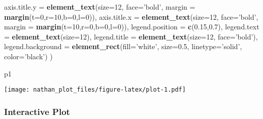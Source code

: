 \documentclass[]{article}
\newenvironment{Shaded}{\begin{snugshade}}{\end{snugshade}}
\newcommand{\KeywordTok}[1]{\textcolor[rgb]{0.13,0.29,0.53}{\textbf{#1}}}
\newcommand{\DataTypeTok}[1]{\textcolor[rgb]{0.13,0.29,0.53}{#1}}
\newcommand{\DecValTok}[1]{\textcolor[rgb]{0.00,0.00,0.81}{#1}}
\newcommand{\FloatTok}[1]{\textcolor[rgb]{0.00,0.00,0.81}{#1}}
\newcommand{\StringTok}[1]{\textcolor[rgb]{0.31,0.60,0.02}{#1}}
\newcommand{\NormalTok}[1]{#1}
\begin{document}
\begin{Shaded}
\begin{Highlighting}[]
    \DataTypeTok{axis.title.y =} \KeywordTok{element_text}\NormalTok{(}\DataTypeTok{size=}\DecValTok{12}\NormalTok{, }\DataTypeTok{face=}\StringTok{'bold'}\NormalTok{, }\DataTypeTok{margin =} \KeywordTok{margin}\NormalTok{(}\DataTypeTok{t=}\DecValTok{0}\NormalTok{,}\DataTypeTok{r=}\DecValTok{10}\NormalTok{,}\DataTypeTok{b=}\DecValTok{0}\NormalTok{,}\DataTypeTok{l=}\DecValTok{0}\NormalTok{)),}
    \DataTypeTok{axis.title.x =} \KeywordTok{element_text}\NormalTok{(}\DataTypeTok{size=}\DecValTok{12}\NormalTok{, }\DataTypeTok{face=}\StringTok{'bold'}\NormalTok{, }\DataTypeTok{margin =} \KeywordTok{margin}\NormalTok{(}\DataTypeTok{t=}\DecValTok{10}\NormalTok{,}\DataTypeTok{r=}\DecValTok{0}\NormalTok{,}\DataTypeTok{b=}\DecValTok{0}\NormalTok{,}\DataTypeTok{l=}\DecValTok{0}\NormalTok{)),}
    \DataTypeTok{legend.position =} \KeywordTok{c}\NormalTok{(}\FloatTok{0.15}\NormalTok{,}\FloatTok{0.7}\NormalTok{),}
    \DataTypeTok{legend.text =} \KeywordTok{element_text}\NormalTok{(}\DataTypeTok{size=}\DecValTok{12}\NormalTok{),}
    \DataTypeTok{legend.title =} \KeywordTok{element_text}\NormalTok{(}\DataTypeTok{size=}\DecValTok{12}\NormalTok{, }\DataTypeTok{face=}\StringTok{'bold'}\NormalTok{),}
    \DataTypeTok{legend.background =} \KeywordTok{element_rect}\NormalTok{(}\DataTypeTok{fill=}\StringTok{'white'}\NormalTok{, }\DataTypeTok{size=}\FloatTok{0.5}\NormalTok{, }\DataTypeTok{linetype=}\StringTok{'solid'}\NormalTok{, }\DataTypeTok{color=}\StringTok{'black'}\NormalTok{)}
\NormalTok{  )}

\NormalTok{p1}
\end{Highlighting}
\end{Shaded}

\texttt{[image: nathan\_plot\_files/figure-latex/plot-1.pdf]}

\subsubsection{Interactive Plot}\label{interactive-plot}
\end{document}
